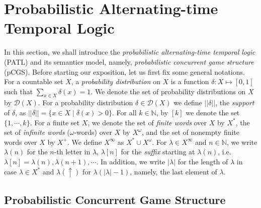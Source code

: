 \documentclass[times, 10 pt,twocolumn]{article}
\newcommand{\mb}[1]{\mathbb{#1}}
\newcommand{\mc}[1]{\mathcal{#1}}
\begin{document}

\section{Probabilistic Alternating-time Temporal Logic}
\label{sec2}

In this section, we shall introduce the \emph{probabilistic
alternating-time temporal logic} (PATL) and its semantics model,
namely, \emph{probabilistic concurrent game structure} (pCGS).
Before starting our exposition, let us first fix some general
notations. For a countable set $X$, a \emph{probability
distribution} on $X$ is a function $\delta: X\mapsto [0,1]$ such
that $\sum_{x\in X}\delta(x)=1$. We denote the set of probability
distributions on $X$ by $\mc{D}(X)$. For a probability
distribution $\delta\in \mc{D}(X)$ we define $||\delta||$, the
\emph{support} of $\delta$, as $||\delta||=\{x\in X\mid \delta(x)>
0\}$. For all $k\in \mb{N}$, by $[k]$ we denote the set
$\{1,\cdots, k\}$. For a finite set $X$, we denote the set of
\emph{finite words} over $X$ by $X^*$, the set of \emph{infinite
words} ($\omega$-words) over $X$ by $X^{\omega}$, and the set of
nonempty finite words over $X$ by $X^+$. %
We define $X^{\infty}$ as $X^*\cup X^{\omega}$. For $\lambda\in
X^{\infty}$ and $n\in \mb{N}$, we write $\lambda(n)$ for the
$n$-th letter in $\lambda$, $\lambda[n]$ for the \emph{suffix}
starting at $\lambda(n)$, i.e. $\lambda[n]=
\lambda(n),\lambda(n+1), \cdots$. In addition, we write
$|\lambda|$ for the length of $\lambda$ in case $\lambda\in X^*$
and $\lambda(\uparrow)$ for
$\lambda(|\lambda|-1)$, namely, the last element of $\lambda$. %

\subsection{Probabilistic Concurrent Game Structure}
\end{document}
